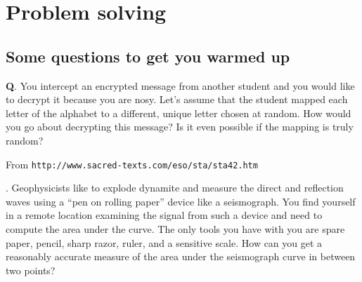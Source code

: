 \chapter{Problem solving}

\setcounter{problem}{1}

\section{Some questions to get you warmed up}


{\bf Q}. You intercept an encrypted message from another student and you would like to decrypt it because you are nosy. Let's assume that the student mapped each letter of the alphabet to a different, unique letter chosen at random. How would you go about decrypting this message? Is it even possible if the mapping is truly random?

\begin{marginfigure}[-1.2in]
\begin{center}
\end{center}
\caption{\tiny From {\tt http://www.sacred-texts.com/eso/sta/sta42.htm}}
\end{marginfigure}


\vspace{15mm}

. Geophysicists like to explode dynamite and measure the direct and reflection waves using a ``pen on rolling paper'' device like a seismograph.  You find yourself in a remote location examining the signal from such a device and need to compute the area under the curve. The only tools you have with you are spare paper, pencil, sharp razor, ruler, and a sensitive scale. How can you get a reasonably accurate measure of the area under the seismograph curve in between two points?

